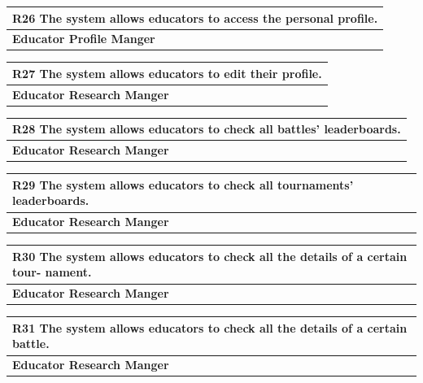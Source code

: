 \documentclass[12pt, a4paper]{report}
\begin{document}
\begin{table}[H]
    \begin{tabularx}{\textwidth}{X}
    \textbf{R26} The system allows educators to access the personal profile.\\
    \hline 
    \textbf{Educator Profile Manger}
\end{tabularx}
\end{table}

\begin{table}[H]
    \begin{tabularx}{\textwidth}{X}
    \textbf{R27} The system allows educators to edit their profile.\\
    \hline 
    \textbf{Educator Research Manger}
    \end{tabularx}
\end{table}

\begin{table}[H]
    \begin{tabularx}{\textwidth}{X}
    \textbf{R28} The system allows educators to check all battles’ leaderboards.\\
    \hline 
    \textbf{Educator Research Manger}
    \end{tabularx}
\end{table}

\begin{table}[H]
    \begin{tabularx}{\textwidth}{X}
    \textbf{R29} The system allows educators to check all tournaments’ leaderboards.\\
    \hline 
    \textbf{Educator Research Manger}
    \end{tabularx}
\end{table}

\begin{table}[H]
    \begin{tabularx}{\textwidth}{X}
    \textbf{R30} The system allows educators to check all the details of a certain tour-
    nament.\\
    \hline 
    \textbf{Educator Research Manger}
    \end{tabularx}
\end{table}

\begin{table}[H]
    \begin{tabularx}{\textwidth}{X}
    \textbf{R31} The system allows educators to check all the details of a certain battle.\\
    \hline 
    \textbf{Educator Research Manger}
    \end{tabularx}
\end{table}
\end{document}
